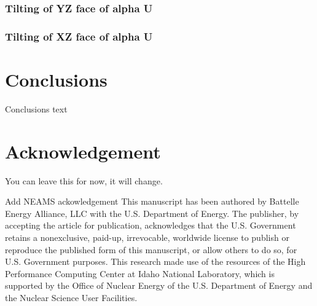 \documentclass[review]{elsarticle}
\begin{document}
\subsubsection{Tilting of YZ face of alpha U}


\subsubsection{Tilting of XZ face of alpha U}






\section{Conclusions}
 Conclusions text

\section{Acknowledgement}

You can leave this for now, it will change. 

Add NEAMS ackowledgement This manuscript has been authored by Battelle Energy Alliance, LLC with
the U.S. Department of Energy. The publisher, by accepting the article for publication, acknowledges that
the U.S. Government retains a nonexclusive, paid-up, irrevocable, worldwide license to publish or reproduce
the published form of this manuscript, or allow others to do so, for U.S. Government purposes. This research
made use of the resources of the High Performance Computing Center at Idaho National Laboratory, which
is supported by the Office of Nuclear Energy of the U.S. Department of Energy and the Nuclear Science
User Facilities.





\end{document}
